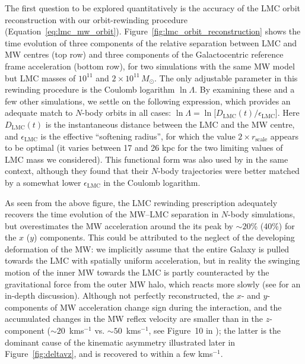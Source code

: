 \documentclass[usenatbib,fleqn]{mnras}
\newcommand{\kms}{km\:s$^{-1}$\xspace}
\begin{document}
The first question to be explored quantitatively is the accuracy of the LMC orbit reconstruction with our orbit-rewinding procedure (Equation~\ref{eq:lmc_mw_orbit}). Figure~\ref{fig:lmc_orbit_reconstruction} shows the time evolution of three components of the relative separation between LMC and MW centres (top row) and three components of the Galactocentric reference frame acceleration (bottom row), for two simulations with the same MW model but LMC masses of $10^{11}$ and $2\times10^{11}\,M_\odot$. The only adjustable parameter in this rewinding procedure is the Coulomb logarithm $\ln\Lambda$. By examining these and a few other simulations, we settle on the following expression, which provides an adequate match to $N$-body orbits in all cases: $\ln\Lambda = \ln \big[ D_\text{LMC}(t) / \epsilon_\text{LMC} \big]$. Here $D_\text{LMC}(t)$ is the instantaneous distance between the LMC and the MW centre, and $\epsilon_\text{LMC}$ is the effective ``softening radius'', for which the value $2\times r_\text{scale}$ appears to be optimal (it varies between 17 and 26 kpc for the two limiting values of LMC mass we considered). This functional form was also used by \citet{Jethwa2016} in the same context, although they found that their $N$-body trajectories were better matched by a somewhat lower $\epsilon_\text{LMC}$ in the Coulomb logarithm.

As seen from the above figure, the LMC rewinding prescription adequately recovers the time evolution of the MW--LMC separation in $N$-body simulations, but overestimates the MW acceleration around the its peak by $\sim20$\% (40\%) for the $x$ ($y$) components. This could be attributed to the neglect of the developing deformation of the MW: we implicitly assume that the entire Galaxy is pulled towards the LMC with spatially uniform acceleration, but in reality the swinging motion of the inner MW towards the LMC is partly counteracted by the gravitational force from the outer MW halo, which reacts more slowly (see \citealt{Vasiliev2021c} for an in-depth discussion). Although not perfectly reconstructed, the $x$- and $y$-components of MW acceleration change sign during the interaction, and the accumulated changes in the MW reflex velocity are smaller than in the $z$-component ($\sim20$~\kms vs. $\sim 50$~\kms, see Figure~10 in \citealt{Vasiliev2021b}); the latter is the dominant cause of the kinematic asymmetry illustrated later in Figure~\ref{fig:deltavz}, and is recovered to within a few \kms.
\end{document}
